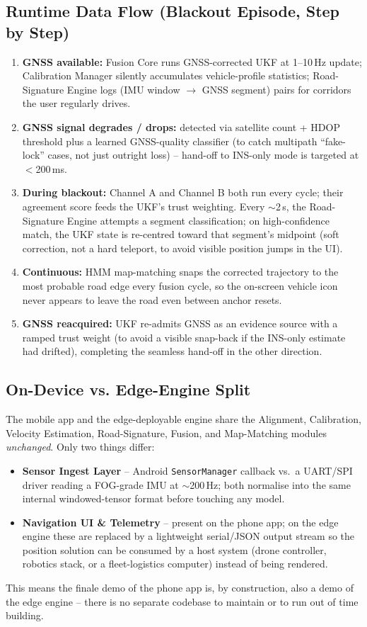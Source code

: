 \documentclass[10.5pt]{article}
\begin{document}
\subsection{Runtime Data Flow (Blackout Episode, Step by Step)}
\begin{enumerate}
\item \textbf{GNSS available:} Fusion Core runs GNSS-corrected UKF at 1--10\,Hz update; Calibration Manager silently accumulates vehicle-profile statistics; Road-Signature Engine logs (IMU window $\to$ GNSS segment) pairs for corridors the user regularly drives.
\item \textbf{GNSS signal degrades / drops:} detected via satellite count + HDOP threshold plus a learned GNSS-quality classifier (to catch multipath ``fake-lock'' cases, not just outright loss) -- hand-off to INS-only mode is targeted at $<$200\,ms.
\item \textbf{During blackout:} Channel A and Channel B both run every cycle; their agreement score feeds the UKF's trust weighting. Every $\sim$2\,s, the Road-Signature Engine attempts a segment classification; on high-confidence match, the UKF state is re-centred toward that segment's midpoint (soft correction, not a hard teleport, to avoid visible position jumps in the UI).
\item \textbf{Continuous:} HMM map-matching snaps the corrected trajectory to the most probable road edge every fusion cycle, so the on-screen vehicle icon never appears to leave the road even between anchor resets.
\item \textbf{GNSS reacquired:} UKF re-admits GNSS as an evidence source with a ramped trust weight (to avoid a visible snap-back if the INS-only estimate had drifted), completing the seamless hand-off in the other direction.
\end{enumerate}

\subsection{On-Device vs. Edge-Engine Split}
The mobile app and the edge-deployable engine share the Alignment, Calibration, Velocity Estimation, Road-Signature, Fusion, and Map-Matching modules \emph{unchanged}. Only two things differ:
\begin{itemize}
\item \textbf{Sensor Ingest Layer} -- Android \texttt{SensorManager} callback vs.\ a UART/SPI driver reading a FOG-grade IMU at $\sim$200\,Hz; both normalise into the same internal windowed-tensor format before touching any model.
\item \textbf{Navigation UI \& Telemetry} -- present on the phone app; on the edge engine these are replaced by a lightweight serial/JSON output stream so the position solution can be consumed by a host system (drone controller, robotics stack, or a fleet-logistics computer) instead of being rendered.
\end{itemize}
This means the finale demo of the phone app is, by construction, also a demo of the edge engine -- there is no separate codebase to maintain or to run out of time building.
\end{document}
